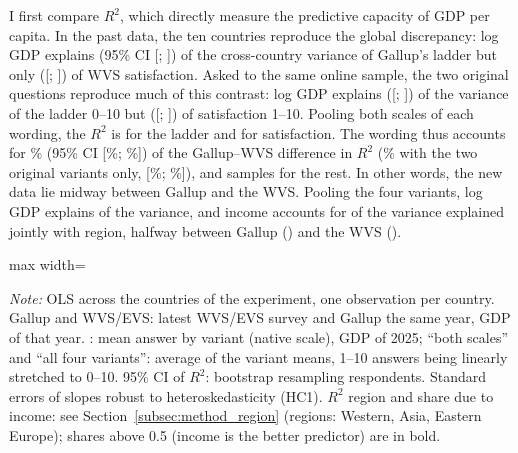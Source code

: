 \documentclass[12pt]{article}
\begin{document}
I first compare $R^2$, which directly measure the predictive capacity of GDP per capita. In the past data, the ten countries reproduce the global discrepancy: log GDP explains \RtwoTenGallup (95\% CI [\decompLowRGallup; \decompHighRGallup]) of the cross-country variance of Gallup's ladder but only \RtwoTenWVS ([\decompLowRWvs; \decompHighRWvs]) of WVS satisfaction. Asked to the same online sample, the two original questions reproduce much of this contrast: log GDP explains \RtwoTenFabreLadder ([\decompLowRFabreLadder; \decompHighRFabreLadder]) of the variance of the ladder 0--10 but \RtwoTenFabreSatisfaction ([\decompLowRFabreSatisfaction; \decompHighRFabreSatisfaction]) of satisfaction 1--10. Pooling both scales of each wording, the $R^2$ is \RtwoTenFabreLadderPooled for the ladder and \RtwoTenFabreSatisfactionPooled for satisfaction. The wording thus accounts for \decompShareRWordingPooledPct\% (95\% CI [\decompLowShareRWordingPooledPct\%; \decompHighShareRWordingPooledPct\%]) of the Gallup--WVS difference in $R^2$ (\decompShareRWordingPct\% with the two original variants only, [\decompLowShareRWordingPct\%; \decompHighShareRWordingPct\%]), and samples for the rest. In other words, the new data lie midway between Gallup and the WVS. Pooling the four variants, log GDP explains \RtwoTenFabreAll of the variance, and income accounts for \shareIncomeTenFabreAll of the variance explained jointly with region, halfway between Gallup (\shareIncomeTenGallup) and the WVS (\shareIncomeTenWVS). 


\begin{table}[htbp]
    \centering
    \caption{Relation between GDP per capita and national well-being in the ten countries of the experiment: past vs.\ new data.}\label{tab:ten_countries}
    \begin{adjustbox}{max width=\textwidth}
    
    \end{adjustbox}
    \begin{minipage}{\textwidth}\footnotesize \textit{Note:} OLS across the \nDecompCountries countries of the experiment, one observation per country. Gallup and WVS/EVS: latest WVS/EVS survey and Gallup the same year, GDP of that year. \newsurvey: mean answer by variant (native scale), GDP of 2025; ``both scales'' and ``all four variants'': average of the variant means, 1--10 answers being linearly stretched to 0--10. 95\% CI of $R^2$: bootstrap resampling respondents. Standard errors of slopes robust to heteroskedasticity (HC1). $R^2$ region and share due to income: see Section~\ref{subsec:method_region} (regions: Western, Asia, Eastern Europe); shares above 0.5 (income is the better predictor) are in bold.\end{minipage}
\end{table}
\end{document}
